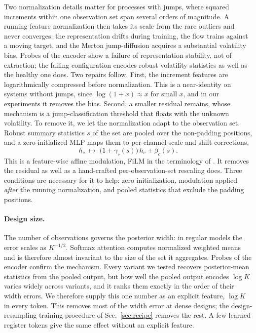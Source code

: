 \documentclass[10pt]{article}
\begin{document}
Two normalization details matter for processes with jumps, where squared increments within one
observation set span several orders of magnitude. A running feature normalization then takes its scale
from the rare outliers and never converges: the representation drifts during training, the flow trains
against a moving target, and the Merton jump-diffusion acquires a substantial volatility bias. Probes
of the encoder show a failure of representation stability, not of extraction; the failing
configuration encodes robust volatility statistics as well as the healthy one does. Two repairs
follow. First, the increment features are logarithmically compressed before normalization. This is a
near-identity on systems without jumps, since $\log(1+x) \approx x$ for small $x$, and in our
experiments it removes the bias. Second, a smaller residual remains, whose mechanism is a
jump-classification threshold that floats with the unknown volatility. To remove it, we let the
normalization adapt to the observation set. Robust summary statistics $s$ of the set are pooled over
the non-padding positions, and a zero-initialized MLP maps them to per-channel scale and shift
corrections,
\begin{equation}
  h_c \;\mapsto\; \bigl(1 + \gamma_c(s)\bigr)\, h_c + \beta_c(s).
  \label{eq:film}
\end{equation}
This is a feature-wise affine modulation, FiLM in the terminology of \citet{perez2018}. It removes the
residual as well as a hand-crafted per-observation-set rescaling does. Three conditions are necessary
for it to help: zero initialization, modulation applied \emph{after} the running normalization, and
pooled statistics that exclude the padding positions.

\paragraph{Design size.} The number of observations governs the posterior width: in regular models the
error scales as $K^{-1/2}$. Softmax attention computes normalized weighted means and is therefore
almost invariant to the size of the set it aggregates. Probes of the encoder confirm the mechanism.
Every variant we tested recovers posterior-mean statistics from the pooled output, but how well the
pooled output encodes $\log K$ varies widely across variants, and it ranks them exactly in the order
of their width errors. We therefore supply this one number as an explicit feature, $\log K$ in every
token. This removes most of the width error at dense designs; the design-resampling training procedure
of Sec.~\ref{sec:recipe} removes the rest. A few learned register tokens \citep{darcet2024} give the
same effect without an explicit feature.
\end{document}
